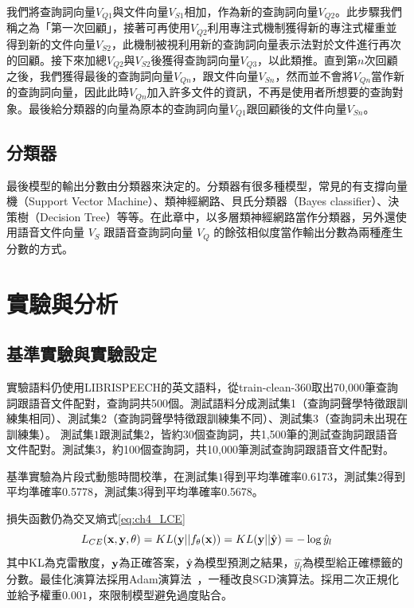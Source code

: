 我們將查詢詞向量$V_{Q1}$與文件向量$V_{S1}$相加，作為新的查詢詞向量$V_{Q2}$。此步驟我們稱之為「第一次回顧」，接著可再使用$V_{Q2}$利用專注式機制獲得新的專注式權重並得到新的文件向量$V_{S2}$，此機制被視利用新的查詢詞向量表示法對於文件進行再次的回顧。接下來加總$V_{Q2}$與$V_{S2}$後獲得查詢詞向量$V_{Q3}$，以此類推。直到第$n$次回顧之後，我們獲得最後的查詢詞向量$V_{Qn}$，跟文件向量$V_{Sn}$，然而並不會將$V_{Qn}$當作新的查詢詞向量，因此此時$V_{Qn}$加入許多文件的資訊，不再是使用者所想要的查詢對象。最後給分類器的向量為原本的查詢詞向量$V_{Q1}$跟回顧後的文件向量$V_{Sn}$。
\subsection{分類器}
最後模型的輸出分數由分類器來決定的。分類器有很多種模型，常見的有支撐向量機（Support
Vector Machine）、類神經網路、貝氏分類器（Bayes
classifier）、決策樹（Decision
Tree）等等。在此章中，以多層類神經網路當作分類器，另外還使用語音文件向量 $V_S$
跟語音查詢詞向量 $V_Q$ 的餘弦相似度當作輸出分數為兩種產生分數的方式。
\label{ch4_classify}
\section{實驗與分析}
\subsection{基準實驗與實驗設定}
實驗語料仍使用LIBRISPEECH的英文語料，從train-clean-360取出70,000筆查詢詞跟語音文件配對，查詢詞共500個。測試語料分成測試集1（查詢詞聲學特徵跟訓練集相同）、測試集2（查詢詞聲學特徵跟訓練集不同）、測試集3（查詢詞未出現在訓練集）。
測試集$1$跟測試集$2$，皆約30個查詢詞，共1,500筆的測試查詢詞跟語音文件配對。測試集$3$，約100個查詢詞，共10,000筆測試查詢詞跟語音文件配對。

基準實驗為片段式動態時間校準，在測試集$1$得到平均準確率0.6173，測試集$2$得到平均準確率0.5778，測試集$3$得到平均準確率0.5678。

損失函數仍為交叉熵式\ref{eq:ch4_LCE}
\begin{equation}
\label{eq:ch4_LCE}
L_{CE}(\bold{x}, \bold{y} , \theta) = KL(\bold{y} || f_{\theta}(\bold{x}))= KL( \bold{y} ||\hat{\bold {y}} )  = - \log \hat{y}_{l} 
\end{equation}
其中KL為克雷散度，$\bold{y}$為正確答案，$\hat{\bold{y}}$為模型預測之結果，$\hat{y_l}$為模型給正確標籤的分數。最佳化演算法採用Adam演算法~\cite{kingma2014adam}，一種改良SGD演算法。採用二次正規化並給予權重$0.001$，來限制模型避免過度貼合。
